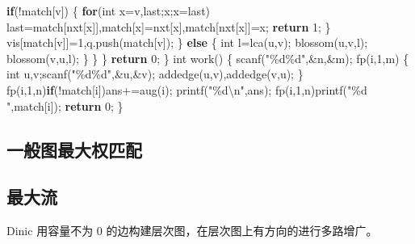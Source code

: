 \documentclass[
]{article}
\newenvironment{Shaded}{}{}
\newcommand{\ControlFlowTok}[1]{\textcolor[rgb]{0.00,0.44,0.13}{\textbf{#1}}}
\newcommand{\DataTypeTok}[1]{\textcolor[rgb]{0.56,0.13,0.00}{#1}}
\newcommand{\DecValTok}[1]{\textcolor[rgb]{0.25,0.63,0.44}{#1}}
\newcommand{\NormalTok}[1]{#1}
\newcommand{\SpecialCharTok}[1]{\textcolor[rgb]{0.25,0.44,0.63}{#1}}
\newcommand{\StringTok}[1]{\textcolor[rgb]{0.25,0.44,0.63}{#1}}
\begin{document}
\begin{Shaded}
\begin{Highlighting}[]
                \ControlFlowTok{if}\NormalTok{(!match[v])}
\NormalTok{                \{}
                    \ControlFlowTok{for}\NormalTok{(}\DataTypeTok{int}\NormalTok{ x=v,last;x;x=last)}
\NormalTok{                        last=match[nxt[x]],match[x]=nxt[x],match[nxt[x]]=x;}
                    \ControlFlowTok{return} \DecValTok{1}\NormalTok{;}
\NormalTok{                \}}
\NormalTok{                vis[match[v]]=}\DecValTok{1}\NormalTok{,q.push(match[v]);}
\NormalTok{            \}}
            \ControlFlowTok{else}
\NormalTok{            \{}
                \DataTypeTok{int}\NormalTok{ l=lca(u,v);}
\NormalTok{                blossom(u,v,l);}
\NormalTok{                blossom(v,u,l);}
\NormalTok{            \}}
\NormalTok{        \}}
\NormalTok{    \}}
    \ControlFlowTok{return} \DecValTok{0}\NormalTok{;}
\NormalTok{\}}
\DataTypeTok{int}\NormalTok{ work()}
\NormalTok{\{}
\NormalTok{    scanf(}\StringTok{"\%d\%d"}\NormalTok{,\&n,\&m);}
\NormalTok{    fp(i,}\DecValTok{1}\NormalTok{,m)}
\NormalTok{    \{}
        \DataTypeTok{int}\NormalTok{ u,v;scanf(}\StringTok{"\%d\%d"}\NormalTok{,\&u,\&v);}
\NormalTok{        addedge(u,v),addedge(v,u);}
\NormalTok{    \}}
\NormalTok{    fp(i,}\DecValTok{1}\NormalTok{,n)}\ControlFlowTok{if}\NormalTok{(!match[i])ans+=aug(i);}
\NormalTok{    printf(}\StringTok{"\%d}\SpecialCharTok{\textbackslash{}n}\StringTok{"}\NormalTok{,ans);}
\NormalTok{    fp(i,}\DecValTok{1}\NormalTok{,n)printf(}\StringTok{"\%d "}\NormalTok{,match[i]);}
    \ControlFlowTok{return} \DecValTok{0}\NormalTok{;}
\NormalTok{\}}
\end{Highlighting}
\end{Shaded}

\hypertarget{ux4e00ux822cux56feux6700ux5927ux6743ux5339ux914d}{%
\subsection{一般图最大权匹配}\label{ux4e00ux822cux56feux6700ux5927ux6743ux5339ux914d}}

\hypertarget{ux6700ux5927ux6d41-1}{%
\subsection{最大流}\label{ux6700ux5927ux6d41-1}}

Dinic 用容量不为 0 的边构建层次图，在层次图上有方向的进行多路增广。
\end{document}
